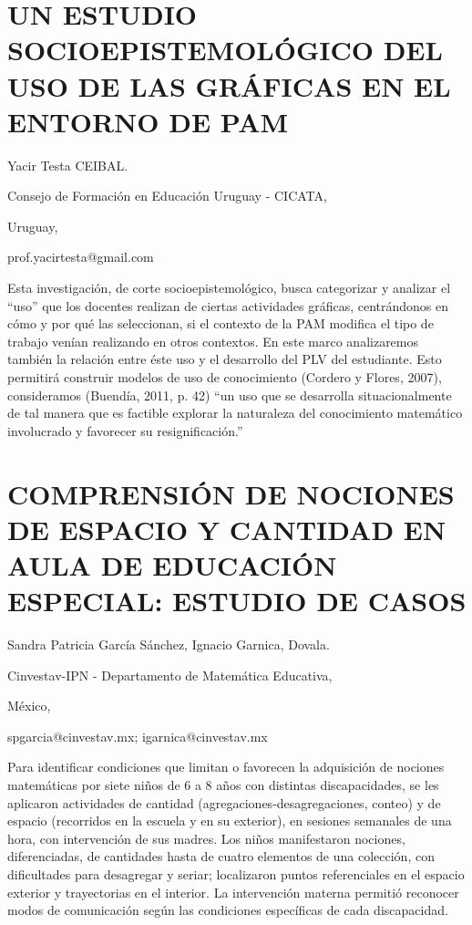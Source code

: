 \section{UN ESTUDIO SOCIOEPISTEMOLÓGICO DEL USO DE LAS GRÁFICAS EN EL ENTORNO
DE PAM}

\begin{datos}

Yacir Testa CEIBAL.

Consejo de Formación en Educación Uruguay - CICATA,

Uruguay,

prof.yacirtesta@gmail.com

\end{datos}

Esta investigación, de corte socioepistemológico, busca categorizar
y analizar el “uso” que los docentes realizan de ciertas actividades
gráficas, centrándonos en cómo y por qué las seleccionan, si el contexto
de la PAM modifica el tipo de trabajo venían realizando en otros contextos.
En este marco analizaremos también la relación entre éste uso y el
desarrollo del PLV del estudiante. Esto permitirá construir modelos
de uso de conocimiento (Cordero y Flores, 2007), consideramos (Buendía,
2011, p. 42) “un uso que se desarrolla situacionalmente de tal manera
que es factible explorar la naturaleza del conocimiento matemático
involucrado y favorecer su resignificación.”


\section{COMPRENSIÓN DE NOCIONES DE ESPACIO Y CANTIDAD EN AULA DE EDUCACIÓN
ESPECIAL: ESTUDIO DE CASOS }

\begin{datos}

Sandra Patricia García Sánchez, Ignacio Garnica, Dovala.

Cinvestav-IPN - Departamento de Matemática Educativa,

México,

spgarcia@cinvestav.mx; igarnica@cinvestav.mx 

\end{datos}

Para identificar condiciones que limitan o favorecen la adquisición
de nociones matemáticas por siete niños de 6 a 8 años con distintas
discapacidades, se les aplicaron actividades de cantidad (agregaciones-desagregaciones,
conteo) y de espacio (recorridos en la escuela y en su exterior),
en sesiones semanales de una hora, con intervención de sus madres.
Los niños manifestaron nociones, diferenciadas, de cantidades hasta
de cuatro elementos de una colección, con dificultades para desagregar
y seriar; localizaron puntos referenciales en el espacio exterior
y trayectorias en el interior. La intervención materna permitió reconocer
modos de comunicación según las condiciones específicas de cada discapacidad.


